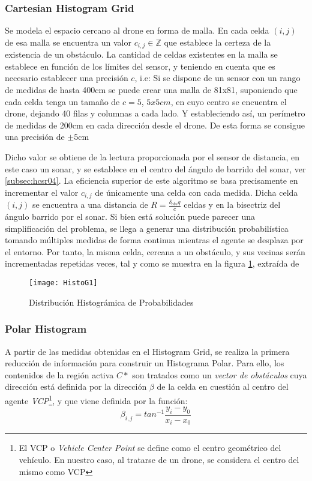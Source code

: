 \subsubsection{Cartesian Histogram Grid}
\label{subsubsec:CHG}
Se modela el espacio cercano al drone en forma de malla. En cada celda $(i,j)$ de esa malla se encuentra un valor $c_{i,j} \in \mathbb{Z}$ que establece la certeza de la existencia de un obstáculo. La cantidad de celdas existentes en la malla se establece en función de los límites del sensor, y teniendo en cuenta que es necesario establecer una precisión $c$, i.e: Si se dispone de un sensor con un rango de medidas de hasta 400cm se puede crear una malla de 81x81, suponiendo que cada celda tenga un tamaño de $c=5$, $5x5cm$, en cuyo centro se encuentra el drone, dejando 40 filas y columnas a cada lado. Y estableciendo así, un perímetro de medidas de 200cm en cada dirección desde el drone. De esta forma se consigue una precisión de $\pm5\text{cm}$

Dicho valor se obtiene de la lectura proporcionada por el sensor de distancia, en este caso un sonar, y se establece en el centro del ángulo de barrido del sonar, ver \ref{subsec:hcsr04}. 
La eficiencia superior de este algoritmo se basa precisamente en incrementar el valor $c_{i,j}$ de únicamente una celda con cada medida. Dicha celda $(i,j)$ se encuentra a una distancia de $R = \frac{\delta_{obs}q}{c}$ celdas y en la bisectriz del ángulo barrido por el sonar.
Si bien está solución puede parecer una simplificación del problema, se llega a generar una distribución probabilística tomando múltiples medidas de forma continua mientras el agente se desplaza por el entorno. Por tanto, la misma celda, cercana a un obstáculo, y sus vecinas serán incrementadas repetidas veces, tal y como se muestra en la figura \ref{fig:histog1}, extraída de \citep{art:BorensteinKorenVFH}
 \begin{figure}[H]
	\centering
	\texttt{[image: HistoG1]}
	\caption{Distribución Histográmica de Probabilidades}\label{fig:histog1}
\end{figure}

\subsubsection{Polar Histogram}
\label{subsubsec:PH}
A partir de las medidas obtenidas en el Histogram Grid, se realiza la primera reducción de información para construir un Histograma Polar. Para ello, los contenidos de la región activa $C*$ son tratados como un \textit{vector de obstáculos} cuya dirección está definida por la dirección $\beta$ de la celda en cuestión al centro del agente \textit{VCP}\footnote{El VCP o \textit{Vehicle Center Point} se define como el centro geométrico del vehículo. En nuestro caso, al tratarse de un drone, se considera el centro del mismo como VCP}, y que viene definida por la función:
\begin{equation}
\label{equation:ObsAgAng}
\beta_{i,j}= tan^{-1} \frac{y_i - y_0}{x_i - x_0}
\end{equation}

